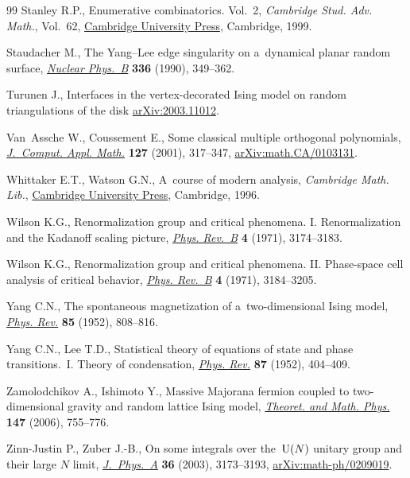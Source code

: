 \begin{thebibliography}{99}
Stanley R.P., Enumerative combinatorics. {V}ol.~2, \textit{Cambridge Stud. Adv.
 Math.}, Vol.~62, \href{https://doi.org/10.1017/CBO9780511609589}{Cambridge
 University Press}, Cambridge, 1999.

Staudacher M., The {Y}ang--{L}ee edge singularity on a~dynamical planar random
 surface, \href{https://doi.org/10.1016/0550-3213(90)90432-D}{\textit{Nuclear
 Phys.~B}} \textbf{336} (1990), 349--362.

Turunen J., Interfaces in the vertex-decorated Ising model on random
 triangulations of the disk
 \href{http://arxiv.org/abs/2003.11012}{arXiv:2003.11012}.

Van~Assche W., Coussement E., Some classical multiple orthogonal polynomials,
 \href{https://doi.org/10.1016/S0377-0427(00)00503-3}{\textit{J.~Comput. Appl.
 Math.}} \textbf{127} (2001), 317--347,
 \href{http://arxiv.org/abs/math.CA/0103131}{arXiv:math.CA/0103131}.

Whittaker E.T., Watson G.N., A~course of modern analysis, \textit{Cambridge Math. Lib.},
 \href{https://doi.org/10.1017/CBO9780511608759}{Cambridge University Press},
 Cambridge, 1996.

Wilson K.G., Renormalization group and critical phenomena. {I}.
 {R}enormalization and the {K}adanoff scaling picture,
 \href{https://doi.org/10.1103/PhysRevB.4.3174}{\textit{Phys. Rev.~B}}
 \textbf{4} (1971), 3174--3183.

Wilson K.G., Renormalization group and critical phenomena. {II}. Phase-space
 cell analysis of critical behavior,
 \href{https://doi.org/10.1103/PhysRevB.4.3184}{\textit{Phys. Rev.~B}}
 \textbf{4} (1971), 3184--3205.

Yang C.N., The spontaneous magnetization of a~two-dimensional {I}sing model,
 \href{https://doi.org/10.1103/PhysRev.85.808}{\textit{Phys. Rev.}}
 \textbf{85} (1952), 808--816.

Yang C.N., Lee T.D., Statistical theory of equations of state and phase
 transitions.~{I}. {T}heory of condensation,
 \href{https://doi.org/10.1103/PhysRev.87.404}{\textit{Phys. Rev.}}
 \textbf{87} (1952), 404--409.

Zamolodchikov A., Ishimoto Y., Massive {M}ajorana fermion coupled to
 two-dimensional gravity and random lattice {I}sing model,
 \href{https://doi.org/10.1007/s11232-006-0076-7}{\textit{Theoret. and Math.
 Phys.}} \textbf{147} (2006), 755--776.

Zinn-Justin P., Zuber J.-B., On some integrals over the~{${\rm U}(N)$} unitary
 group and their large {$N$} limit,
 \href{https://doi.org/10.1088/0305-4470/36/12/318}{\textit{J.~Phys.~A}}
 \textbf{36} (2003), 3173--3193,
 \href{http://arxiv.org/abs/math-ph/0209019}{arXiv:math-ph/0209019}.

\end{thebibliography}
